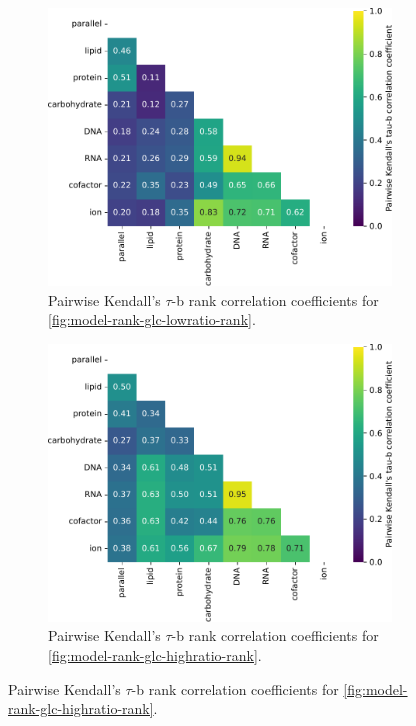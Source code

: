 \begin{figure}
  \begin{subfigure}[t]{0.45\textwidth}
  \centering
    \includegraphics[width=\linewidth]{CompareEnzUse_glc16p89_pyrUnres_ammUnres_2.pdf}
    \caption{
      Pairwise Kendall's $\tau$-b rank correlation coefficients for \ref{fig:model-rank-glc-lowratio-rank}.
    }
    \label{fig:model-rank-glc-lowratio-kendall}
  \end{subfigure}%
  \begin{subfigure}[t]{0.45\textwidth}
  \centering
    \includegraphics[width=\linewidth]{CompareEnzUse_glc01p69_pyrUnres_amm01p05_2.pdf}
    \caption{
      Pairwise Kendall's $\tau$-b rank correlation coefficients for \ref{fig:model-rank-glc-highratio-rank}.
    }
    \label{fig:model-rank-glc-highratio-kendall}
  \end{subfigure}


\end{figure}
